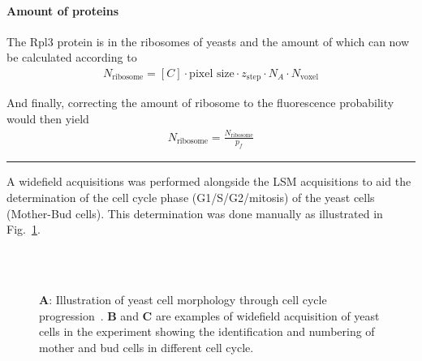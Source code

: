 \paragraph{Amount of proteins}
The Rpl3 protein is in the ribosomes of yeasts and the amount of which can now be calculated according to
\begin{align} 
N_{\text{ribosome}} = [C] \cdot \text{pixel size} \cdot z_{\text{step}} \cdot N_{A} \cdot N_{\text{voxel}}
\end{align}

And finally, correcting the amount of ribosome to the fluorescence probability would then yield
\begin{align} 
N_{\text{ribosome}} = \frac{N_{\text{ribosome}}}{p_f}
\end{align}

\begin{center}
\par\noindent\rule{0.8\textwidth}{0.4pt}
\end{center}

A widefield acquisitions was performed alongside the LSM acquisitions to aid the determination of the cell cycle phase (G1/S/G2/mitosis) of the yeast cells (Mother-Bud cells). This determination was done manually as illustrated in Fig.~\ref{fig:wideyeast}. 

\begin{figure}[!h]
\centering
\captionsetup[subfigure]{position=top}
\\\vspace{-0.7em}
\captionsetup[subfigure]{position=bottom}
\hspace{0.1mm}
\\
\caption{\textbf{A}: Illustration of yeast cell morphology through cell cycle progression~\cite{Yu2011}. 
\textbf{B} and \textbf{C} are examples of widefield acquisition of yeast cells in the experiment showing the identification and numbering of mother and bud cells in different cell cycle.}
\label{fig:wideyeast}
\end{figure}

